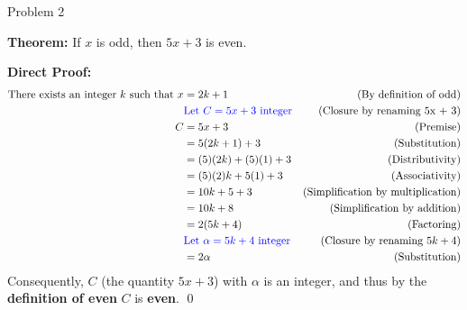 \begin{problem}{Problem 2}
    \begin{Highlight}
        \textbf{Theorem:} If $x$ is odd, then $5x + 3$ is even. \vspace*{1em}

        \textbf{Direct Proof:} \newline
        \begin{align*}
            \text{There exists an integer $k$ such that } x & = 2k + 1 & \text{(By definition of odd)} \\
            & \textcolor{blue}{\text{Let } C = 5x + 3 \text{ integer}} & \text{(Closure by renaming 5x + 3)} \\
            C & = 5x + 3 & \text{(Premise)} \\
            & = 5(2k + 1) + 3 & \text{(Substitution)} \\
            & = (5)(2k) + (5)(1) + 3 & \text{(Distributivity)} \\
            & = (5)(2)k + 5(1) + 3 & \text{(Associativity)} \\
            & = 10k + 5 + 3 & \text{(Simplification by multiplication)} \\
            & = 10k + 8 & \text{(Simplification by addition)} \\
            & = 2(5k + 4) & \text{(Factoring)} \\
            & \textcolor{blue}{\text{Let } \alpha = 5k + 4 \text{ integer}} & \text{(Closure by renaming $5k + 4$)} \\
            & = 2\alpha & \text{(Substitution)} \\
        \end{align*}
        Consequently, $C$ (the quantity $5x + 3$) with $\alpha$ is an integer, and thus by the \textbf{definition of even} $C$ is \textbf{even}. \qed
    \end{Highlight}
\end{problem}

